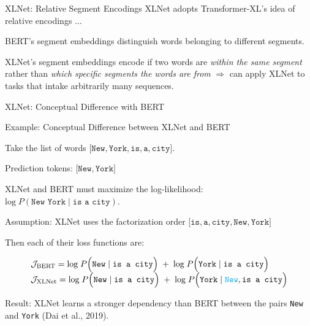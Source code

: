 \begin{frame}{XLNet: Relative Segment Encodings}
    \small XLNet adopts Transformer-XL's idea of relative encodings ... 
    
    \begin{itemizeSpaced}{10pt}
        \small 
        \item BERT's segment embeddings distinguish words belonging to different segments. 
        
        \pinkbox XLNet's segment embeddings encode if two words are \emph{within the same segment} rather than \emph{which specific segments the words are from} $\Rightarrow$ can apply XLNet to tasks that intake arbitrarily many sequences. 
    \end{itemizeSpaced}
    
\end{frame}


\begin{frame}{XLNet: Conceptual Difference with BERT}

    \vspace{20pt}
    
    \begin{exampleBlock}{Example: Conceptual Difference between XLNet and BERT}
    

    Take the list of words $\Big[ \texttt{New}, \texttt{York}, \texttt{is}, \texttt{a}, \texttt{city} \Big]$. 
    
    Prediction tokens: $\Big[ \texttt{New}, \texttt{York} \Big]$ 
    
    XLNet and BERT must maximize the log-likelihood: $\text{log} \; P(\texttt{New York} \; | \; \texttt{is a city})$. 
    
    Assumption: XLNet uses the factorization order $\Big[ \texttt{is}, \texttt{a}, \texttt{city}, \texttt{New}, \texttt{York} \Big]$
    
    Then each of their loss functions are: 
    
    \begin{equation}
    \begin{array}{ll}
    \mathcal{J}_\text{BERT} = \text{log} \; P \Big( \texttt{New} \; | \; \texttt{is a city} \Big) \; + \; \text{log} \; P \Big( \texttt{York} \; | \; \texttt{is a city} \Big) \\
    \mathcal{J}_\text{XLNet} = \text{log} \; P \Big( \texttt{New} \; | \; \texttt{is a city} \Big) \; + \; \text{log} \; P \Big( \texttt{York} \; | \; {\color{cyan} \texttt{New}}, \texttt{is a city} \Big) 
    \end{array}
    \end{equation}
    
    Result: XLNet learns a stronger dependency than BERT between the pairs \texttt{New} and \texttt{York} (Dai et al., 2019). 
    
    \end{exampleBlock}
    
\end{frame}